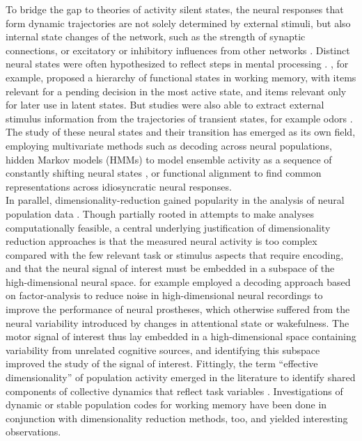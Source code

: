 To bridge the gap to theories of activity silent states, the neural responses that form dynamic trajectories are not solely determined by external stimuli, but also internal state changes of the network, such as the strength of synaptic connections, or excitatory or inhibitory influences from other networks \citep{buonomano2009state}.
Distinct neural states were often hypothesized to reflect steps in mental processing \citep[e.g.,][]{seidemann1996simultaneously}.
\citet{muhle2021hierarchy}, for example, proposed a hierarchy of functional states in working memory, with items relevant for a pending decision in the most active state, and items relevant only for later use in latent states.
But studies were also able to extract external stimulus information from the trajectories of transient states, for example odors \citep{mazor2005transient}.
The study of these neural states and their transition has emerged as its own field, employing multivariate methods such as decoding across neural populations, hidden Markov models (HMMs) \citep{rainer2000neural} to model ensemble activity as a sequence of constantly shifting neural states \citep{vidaurre2016spectrally}, or functional alignment \citep{haxby2011common} to find common representations across idiosyncratic neural responses.\\
In parallel, dimensionality-reduction gained popularity in the analysis of neural population data \citep{cunningham2014dimensionality}.
Though partially rooted in attempts to make analyses computationally feasible, a central underlying justification of dimensionality reduction approaches is that the measured neural activity is too complex compared with the few relevant task or stimulus aspects that require encoding, and that the neural signal of interest must be embedded in a subspace of the high-dimensional neural space.
\citet{santhanam2009factor} for example employed a decoding approach based on factor-analysis to reduce noise in high-dimensional neural recordings to improve the performance of neural prostheses, which otherwise suffered from the neural variability introduced by changes in attentional state or wakefulness.
The motor signal of interest thus lay embedded in a high-dimensional space containing variability from unrelated cognitive sources, and identifying this subspace improved the study of the signal of interest.
Fittingly, the term ``effective dimensionality'' of population activity emerged in the literature to identify shared components of collective dynamics that reflect task variables \citep{jazayeri2021interpreting}.
Investigations of dynamic or stable population codes for working memory have been done in conjunction with dimensionality reduction methods, too, and yielded interesting observations.
